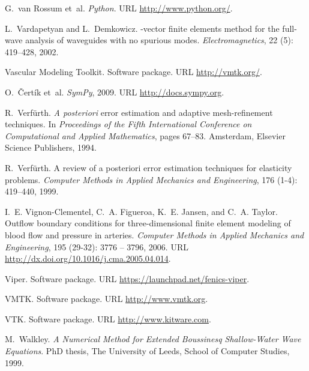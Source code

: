 \begin{thebibliography}{467}
G.~van Rossum et~al.
\newblock \emph{Python}.
\newblock URL \url{http://www.python.org/}.

L.~Vardapetyan and L.~Demkowicz.
-vector finite elements method for the full-wave analysis of
  waveguides with no spurious modes.
\newblock \emph{Electromagnetics}, 22 (5): 419--428, 2002.

{Vascular Modeling Toolkit}.
\newblock Software package.
\newblock URL \url{http://vmtk.org/}.

O.~\v{C}ert\'{i}k et~al.
\newblock \emph{{SymPy}}, 2009.
\newblock URL \url{http://docs.sympy.org}.

R.~Verf{\"u}rth.
\newblock \emph{A posteriori} error estimation and adaptive mesh-refinement
  techniques.
\newblock In \emph{Proceedings of the Fifth International Conference on
  Computational and Applied Mathematics}, pages 67--83. Amsterdam, Elsevier
  Science Publishers, 1994.

R.~Verf{\"u}rth.
\newblock A review of a posteriori error estimation techniques for elasticity
  problems.
\newblock \emph{Computer Methods in Applied Mechanics and Engineering},
  176 (1-4): 419--440, 1999.

I.~E. Vignon-Clementel, C.~A. Figueroa, K.~E. Jansen, and C.~A. Taylor.
\newblock Outflow boundary conditions for three-dimensional finite element
  modeling of blood flow and pressure in arteries.
\newblock \emph{Computer Methods in Applied Mechanics and Engineering},
  195 (29-32): 3776 -- 3796, 2006.
\newblock URL \url{http://dx.doi.org/10.1016/j.cma.2005.04.014}.

Viper.
\newblock Software package.
\newblock URL \url{https://launchpad.net/fenics-viper}.

VMTK.
\newblock Software package.
\newblock URL \url{http://www.vmtk.org}.

VTK.
\newblock Software package.
\newblock URL \url{http://www.kitware.com}.

M.~Walkley.
\newblock \emph{A Numerical Method for Extended {B}oussinesq Shallow-Water Wave
  Equations}.
\newblock PhD thesis, The University of Leeds, School of Computer Studies,
  1999.


\end{thebibliography}
